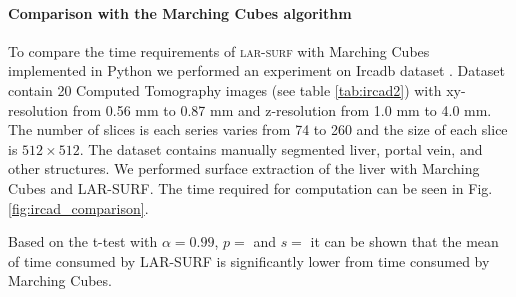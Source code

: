 \paragraph{Comparison with the Marching Cubes algorithm}
To compare the time requirements of \textsc{lar-surf} with Marching Cubes implemented in Python we performed an experiment on Ircadb dataset \cite{ircadb}. Dataset contain 20 Computed Tomography images (see table \ref{tab:ircad2}) with xy-resolution from 0.56 mm to 0.87 mm and z-resolution from 1.0 mm to 4.0 mm. 
The number of slices is each series varies from 74 to 260 and the size of each slice is $512\times512$. 
The dataset contains manually segmented liver, portal vein, and other structures. We performed surface extraction of the liver with Marching Cubes and LAR-SURF. The time required for computation can be seen in Fig. \ref{fig:ircad_comparison}. 

Based on the t-test with $\alpha=0.99$, $p=$ and 
$s=$ it can be shown that the mean of time consumed by LAR-SURF is significantly lower from time consumed by Marching Cubes.



